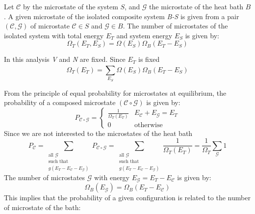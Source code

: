\documentclass[../main/main.tex]{subfiles}
\begin{document}
Let \( \mathcal{C}  \) by the microstate of the system \( S \), and \( \mathcal{G}  \) the microstate of the heat bath \( B \).
A given microstate of the isolated composite system \emph{B-S} is given from a pair \( (\mathcal{C},\mathcal{G}  ) \) of microstate \( \mathcal{C} \in S  \) and   \( \mathcal{G} \in B  \).
The number of microstates of the isolated system with total energy \( E_T \) and system energy \( E_S \)  is given by:
\begin{equation*}
  \Omega _T (E_T,E_S) = \Omega (E_S) \Omega _B (E_T - E_S)
\end{equation*}
\begin{remark}
In this analysis \emph{V} and \emph{N} are fixed. Since \( E_T \) is fixed
\begin{equation}
  \Omega _T (E_T) = \sum_{E_S}^{} \Omega (E_S) \Omega _B (E_T - E_S)
\end{equation}
\end{remark}
From the principle of equal probability for microstates at equilibrium, the probability of a composed microstate \( (\mathcal{C} \circ \mathcal{G}  ) \) is given by:
\begin{equation}
P_{\mathcal{C} \circ \mathcal{G}} =
  \begin{cases}
   \frac{1}{\Omega _T (E_T)} & E_{\mathcal{C} } + E_{\mathcal{G} } = E_T \\
  0 & \text{otherwise}
  \end{cases}
\end{equation}
Since we are not interested to the microstates of the heat bath
\begin{equation}
  P_{\mathcal{C} } = \sum_{\substack{ \text{all } \mathcal{G}  \\  \text{such that}  \\ g (E_T -E_{\mathcal{C} } - E_{\mathcal{G} }) } }^{} P_{\mathcal{C} \circ \mathcal{G}}   = 
  \sum_{\substack{ \text{all } \mathcal{G}  \\  \text{such that}  \\ g (E_T -E_{\mathcal{C} } - E_{\mathcal{G} }) } }^{} \frac{1}{\Omega _T (E_T)} = \frac{1}{\Omega _T} \sum_{\mathcal{G} }^{}   1
\end{equation}
The number of microstates \( \mathcal{G}  \) with energy \( E_{\mathcal{G} }= E_T - E_{\mathcal{C} } \) is given by:
\begin{equation*}
  \Omega _B (E_{\mathcal{G} }) = \Omega_B (E_T - E_{\mathcal{C} })
\end{equation*}
This implies that the probability of a given configuration is related to the number of microstate of the bath:
\end{document}
